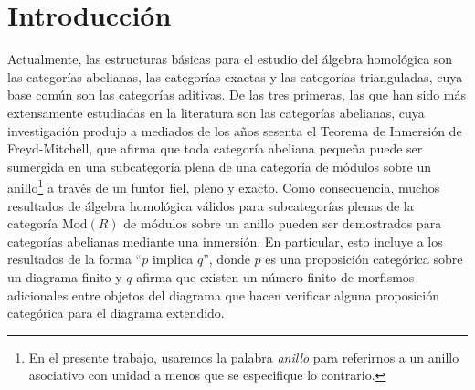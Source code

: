 \documentclass[tesis]{subfiles}
\begin{document}
\chapter*{Introducción}\label{Chap: Introducción} %

Actualmente, las estructuras básicas para el estudio del álgebra homológica son las categorías abelianas, las categorías exactas y las categorías trianguladas, cuya base común son las categorías aditivas. De las tres primeras, las que han sido más extensamente estudiadas en la literatura son las categorías abelianas\cite{Freyd}\cite{Mitchell}\cite{Popescu}, cuya investigación produjo a mediados de los años sesenta el Teorema de Inmersión de Freyd-Mitchell, que afirma que toda categoría abeliana pequeña puede ser sumergida en una subcategoría plena de una categoría de módulos sobre un anillo\footnote{En el presente trabajo, usaremos la palabra \emph{anillo} para referirnos a un anillo asociativo con unidad a menos que se especifique lo contrario.} a través de un funtor fiel, pleno y exacto. Como consecuencia, muchos resultados de álgebra homológica válidos para subcategorías plenas de la categoría $\text{Mod}(R)$ de módulos sobre un anillo pueden ser demostrados para categorías abelianas mediante una inmersión. En particular, esto incluye a los resultados de la forma ``$p$ implica $q$'', donde $p$ es una proposición categórica sobre un diagrama finito y $q$ afirma que existen un número finito de morfismos adicionales entre objetos del diagrama que hacen verificar alguna proposición categórica para el diagrama extendido\cite[{}VI.7.3]{Mitchell}. \\
\end{document}

